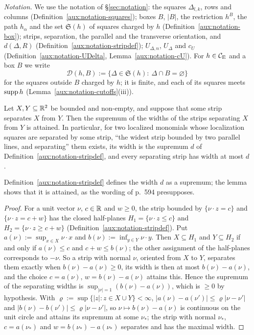 \emph{Notation.}  We use the notation of \S\ref{sec:notation}: the squares $\Delta_{l,k}$, rows
and columns (Definition~\ref{aux:notation-squares}); boxes $B$, $|B|$, the restriction $h^B$,
the path $h_\alpha$ and the set $\mathfrak S(h)$ of squares charged by $h$
(Definition~\ref{aux:notation-box}); strips, separation, the parallel and the transverse
orientation, and $d(\Delta,R)$ (Definition~\ref{aux:notation-stripdef}); $U_{\Delta,n}$,
$U_\Delta$ and $c_U$ (Definition~\ref{aux:notation-UDelta}, Lemma~\ref{aux:notation-cU}).  For
$h\in\mathcal{C}_{\mathrm E}$ and a box $B$ we write
\[
 \mathcal D(h,B):=\{\Delta\in\mathfrak S(h):\ \Delta\cap B=\varnothing\}
\]
for the squares outside $B$ charged by $h$; it is finite, and each of its squares meets
$\operatorname{supp} h$ (Lemma~\ref{aux:notation-cutoffs}(iii)).

\begin{auxlemma}\label{aux:d2-widest}
Let $X,Y\subseteq\mathbb{R}^2$ be bounded and non-empty, and suppose that some strip separates $X$
from $Y$.  Then the supremum of the widths of the strips separating $X$ from $Y$ is attained.
In particular, for two localized monomials whose localization squares are separated by some
strip, ``the widest strip bounded by two parallel lines, and separating'' them
\cite[p.~594]{GJS} exists, its width is the supremum $d$ of
Definition~\ref{aux:notation-stripdef}, and every separating strip has width at most $d$.
\end{auxlemma}

Definition~\ref{aux:notation-stripdef} defines the width $d$ as a supremum; the lemma shows that
it is attained, as the wording of p.~594 presupposes.

\begin{proof}
For a unit vector $\nu$, $c\in\mathbb{R}$ and $w\ge0$, the strip bounded by $\{\nu\cdot z=c\}$ and
$\{\nu\cdot z=c+w\}$ has the closed half-planes $H_1=\{\nu\cdot z\le c\}$ and
$H_2=\{\nu\cdot z\ge c+w\}$ (Definition~\ref{aux:notation-stripdef}).  Put
$a(\nu):=\sup_{x\in X}\nu\cdot x$ and $b(\nu):=\inf_{y\in Y}\nu\cdot y$.  Then $X\subseteq H_1$
and $Y\subseteq H_2$ if and only if $a(\nu)\le c$ and $c+w\le b(\nu)$; the other assignment of
the half-planes corresponds to $-\nu$.  So a strip with normal $\nu$, oriented from $X$ to
$Y$, separates them exactly when $b(\nu)-a(\nu)\ge0$, its width is then at most
$b(\nu)-a(\nu)$, and the choice $c=a(\nu)$, $w=b(\nu)-a(\nu)$ attains this.  Hence the
supremum of the separating widths is $\sup_{|\nu|=1}(b(\nu)-a(\nu))$, which is $\ge0$ by
hypothesis.  With $\varrho:=\sup\{|z|:z\in X\cup Y\}<\infty$,
$|a(\nu)-a(\nu')|\le\varrho|\nu-\nu'|$ and $|b(\nu)-b(\nu')|\le\varrho|\nu-\nu'|$, so
$\nu\mapsto b(\nu)-a(\nu)$ is continuous on the unit circle and attains its supremum at some
$\nu_*$; the strip with normal $\nu_*$, $c=a(\nu_*)$ and $w=b(\nu_*)-a(\nu_*)$ separates and has
the maximal width.
\end{proof}

